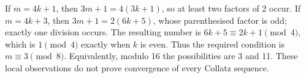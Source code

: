 If $m=4k+1$, then $3m+1=4(3k+1)$, so at least two factors of 2 occur. If $m=4k+3$, then $3m+1=2(6k+5)$, whose parenthesised factor is odd; exactly one division occurs. The resulting number is $6k+5\equiv2k+1\pmod4$, which is $1\pmod4$ exactly when $k$ is even. Thus the required condition is $\boxed{m\equiv3\pmod8}$. Equivalently, modulo 16 the possibilities are 3 and 11. These local observations do not prove convergence of every Collatz sequence.
